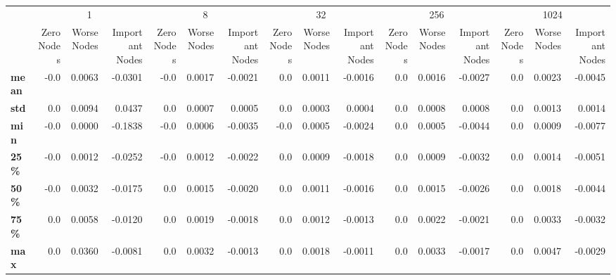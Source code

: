 \begin{tabular}{lrrrrrrrrrrrrrrr}
\toprule
{} & \multicolumn{3}{c}{1} & \multicolumn{3}{c}{8} & \multicolumn{3}{c}{32} & \multicolumn{3}{c}{256} & \multicolumn{3}{c}{1024} \\
{} & Zero Nodes & Worse Nodes & Important Nodes & Zero Nodes & Worse Nodes & Important Nodes & Zero Nodes & Worse Nodes & Important Nodes & Zero Nodes & Worse Nodes & Important Nodes & Zero Nodes & Worse Nodes & Important Nodes \\
\midrule
\textbf{mean} &       -0.0 &      0.0063 &         -0.0301 &       -0.0 &      0.0017 &         -0.0021 &        0.0 &      0.0011 &         -0.0016 &        0.0 &      0.0016 &         -0.0027 &        0.0 &      0.0023 &         -0.0045 \\
\textbf{std } &        0.0 &      0.0094 &          0.0437 &        0.0 &      0.0007 &          0.0005 &        0.0 &      0.0003 &          0.0004 &        0.0 &      0.0008 &          0.0008 &        0.0 &      0.0013 &          0.0014 \\
\textbf{min } &       -0.0 &      0.0000 &         -0.1838 &       -0.0 &      0.0006 &         -0.0035 &       -0.0 &      0.0005 &         -0.0024 &        0.0 &      0.0005 &         -0.0044 &        0.0 &      0.0009 &         -0.0077 \\
\textbf{25\% } &       -0.0 &      0.0012 &         -0.0252 &       -0.0 &      0.0012 &         -0.0022 &        0.0 &      0.0009 &         -0.0018 &        0.0 &      0.0009 &         -0.0032 &        0.0 &      0.0014 &         -0.0051 \\
\textbf{50\% } &       -0.0 &      0.0032 &         -0.0175 &        0.0 &      0.0015 &         -0.0020 &        0.0 &      0.0011 &         -0.0016 &        0.0 &      0.0015 &         -0.0026 &        0.0 &      0.0018 &         -0.0044 \\
\textbf{75\% } &        0.0 &      0.0058 &         -0.0120 &        0.0 &      0.0019 &         -0.0018 &        0.0 &      0.0012 &         -0.0013 &        0.0 &      0.0022 &         -0.0021 &        0.0 &      0.0033 &         -0.0032 \\
\textbf{max } &        0.0 &      0.0360 &         -0.0081 &        0.0 &      0.0032 &         -0.0013 &        0.0 &      0.0018 &         -0.0011 &        0.0 &      0.0033 &         -0.0017 &        0.0 &      0.0047 &         -0.0029 \\
\bottomrule
\end{tabular}
